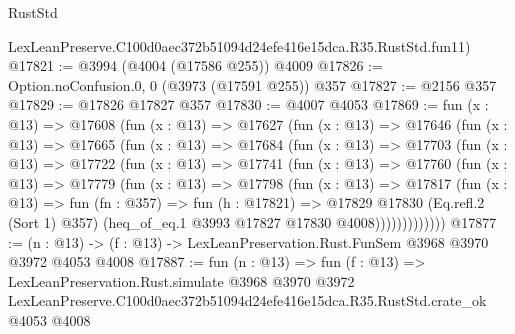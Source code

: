 \begin{lexlean}{RustStd}
\begin{coremodule}
    LexLeanPreserve.C100d0aec372b51094d24efe416e15dca.R35.RustStd.fun11)
@17821 := @3994 (@4004 (@17586 @255)) @4009
@17826 := Option.noConfusion.{0, 0} (@3973 (@17591 @255)) @357
@17827 := @2156 @357
@17829 := @17826 @17827 @357
@17830 := @4007 @4053
@17869 := fun (x : @13) =>
  @17608
    (fun (x : @13) =>
    @17627
      (fun (x : @13) =>
      @17646
        (fun (x : @13) =>
        @17665
          (fun (x : @13) =>
          @17684
            (fun (x : @13) =>
            @17703
              (fun (x : @13) =>
              @17722
                (fun (x : @13) =>
                @17741
                  (fun (x : @13) =>
                  @17760
                    (fun (x : @13) =>
                    @17779
                      (fun (x : @13) =>
                      @17798
                        (fun (x : @13) =>
                        @17817
                          (fun (x : @13) =>
                          fun (fn : @357) =>
                          fun (h : @17821) =>
                          @17829
                            @17830
                            (Eq.refl.{2} (Sort 1) @357)
                            (heq_of_eq.{1} @3993 @17827 @17830 @4008)))))))))))))
@17877 := (n : @13) -> (f : @13) -> LexLeanPreservation.Rust.FunSem @3968 @3970 @3972 @4053 @4008
@17887 := fun (n : @13) =>
  fun (f : @13) =>
  LexLeanPreservation.Rust.simulate
    @3968
    @3970
    @3972
    LexLeanPreserve.C100d0aec372b51094d24efe416e15dca.R35.RustStd.crate_ok
    @4053
    @4008
\end{coremodule}
\end{lexlean}
